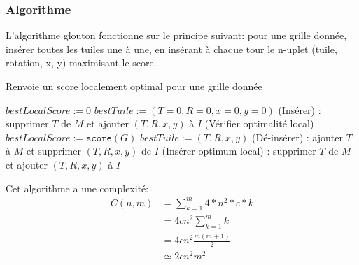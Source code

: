 \documentclass[10pt]{article}
\begin{document}
      \subsubsection{Algorithme}
      	L'algorithme glouton fonctionne sur le principe suivant: pour une grille donnée, insérer toutes les tuiles une à une,
	en insérant à chaque tour le n-uplet (tuile, rotation, x, y) maximisant le score.
	\begin{algorithm}
	  \caption{Renvoie un score localement optimal pour une grille donnée}
	  \begin{algorithmic}[1]
		\State $bestLocalScore := 0$
		\State $bestTuile := (T=0, R=0, x=0, y=0)$
			  \State (Insérer) : supprimer $T$ de $M$ et ajouter $(T, R, x, y)$ à $I$
			  \State (Vérifier optimalité local)
			    \State $bestLocalScore := \mathtt{score}(G)$
			    \State $bestTuile := (T, R, x, y)$
			  \EndIf
			  \State (Dé-insérer) : ajouter $T$ à $M$ et supprimer $(T, R, x, y)$ de $I$
			\EndIf
		      \EndFor
		    \EndFor
		  \EndFor
		\EndFor
		\State (Insérer optimum local) : supprimer $T$ de $M$ et ajouter $(T, R, x, y)$ à $I$
	      \EndWhile
	    \EndFunction
	  \end{algorithmic}
	\end{algorithm}
	\newline
	Cet algorithme a une complexité:
	\begin{equation} \label{eq1}
	  \begin{split}
	    C(n, m) & = \sum_{k=1}^{m}{4*n^2*c*k} \\
		    & = 4cn^2 \sum_{k=1}^{m}{k} \\
		    & = 4cn^2 \frac{m(m+1)}{2} \\
		    & \boxed{\simeq 2cn^2m^2}
	  \end{split}
	\end{equation}
      \newpage
\end{document}
